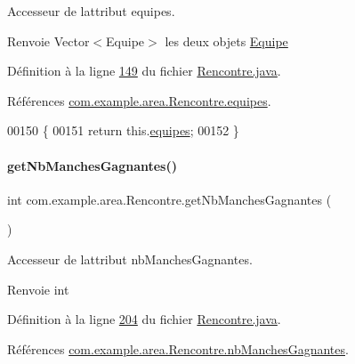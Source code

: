 Accesseur de l\textquotesingle{}attribut equipes. 

\begin{DoxyReturn}{Renvoie}
Vector$<$\+Equipe$>$ les deux objets \hyperlink{classcom_1_1example_1_1area_1_1_equipe}{Equipe} 
\end{DoxyReturn}


Définition à la ligne \hyperlink{_rencontre_8java_source_l00149}{149} du fichier \hyperlink{_rencontre_8java_source}{Rencontre.\+java}.



Références \hyperlink{_rencontre_8java_source_l00022}{com.\+example.\+area.\+Rencontre.\+equipes}.


\begin{DoxyCode}
00150     \{
00151         \textcolor{keywordflow}{return} this.\hyperlink{classcom_1_1example_1_1area_1_1_rencontre_accbafe5a878f457fb7119cfd55401c86}{equipes};
00152     \}
\end{DoxyCode}
\mbox{\label{classcom_1_1example_1_1area_1_1_rencontre_a8f7801a28279d1fb26b0961d05c55bdd}} 
\paragraph{\texorpdfstring{get\+Nb\+Manches\+Gagnantes()}{getNbManchesGagnantes()}}
{\footnotesize\ttfamily int com.\+example.\+area.\+Rencontre.\+get\+Nb\+Manches\+Gagnantes (\begin{DoxyParamCaption}{ }\end{DoxyParamCaption})}



Accesseur de l\textquotesingle{}attribut nb\+Manches\+Gagnantes. 

\begin{DoxyReturn}{Renvoie}
int 
\end{DoxyReturn}


Définition à la ligne \hyperlink{_rencontre_8java_source_l00204}{204} du fichier \hyperlink{_rencontre_8java_source}{Rencontre.\+java}.



Références \hyperlink{_rencontre_8java_source_l00026}{com.\+example.\+area.\+Rencontre.\+nb\+Manches\+Gagnantes}.


